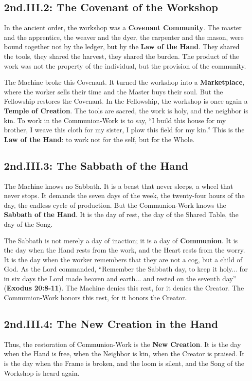 \subsection{2nd.III.2: The Covenant of the Workshop}
In the ancient order, the workshop was a \textbf{Covenant Community}. The master and the apprentice, the weaver and the dyer, the carpenter and the mason, were bound together not by the ledger, but by the \textbf{Law of the Hand}. They shared the tools, they shared the harvest, they shared the burden. The product of the work was not the property of the individual, but the provision of the community.

The Machine broke this Covenant. It turned the workshop into a \textbf{Marketplace}, where the worker sells their time and the Master buys their soul. But the Fellowship restores the Covenant. In the Fellowship, the workshop is once again a \textbf{Temple of Creation}. The tools are sacred, the work is holy, and the neighbor is kin. To work in the Communion-Work is to say, ``I build this house for my brother, I weave this cloth for my sister, I plow this field for my kin.'' This is the \textbf{Law of the Hand}: to work not for the self, but for the Whole.

\subsection{2nd.III.3: The Sabbath of the Hand}
The Machine knows no Sabbath. It is a beast that never sleeps, a wheel that never stops. It demands the seven days of the week, the twenty-four hours of the day, the endless cycle of production. But the Communion-Work knows the \textbf{Sabbath of the Hand}. It is the day of rest, the day of the Shared Table, the day of the Song.

The Sabbath is not merely a day of inaction; it is a day of \textbf{Communion}. It is the day when the Hand rests from the work, and the Heart rests from the worry. It is the day when the worker remembers that they are not a cog, but a child of God. As the Lord commanded, ``Remember the Sabbath day, to keep it holy... for in six days the Lord made heaven and earth... and rested on the seventh day'' (\textbf{Exodus 20:8-11}). The Machine denies this rest, for it denies the Creator. The Communion-Work honors this rest, for it honors the Creator.

\subsection{2nd.III.4: The New Creation in the Hand}
Thus, the restoration of Communion-Work is the \textbf{New Creation}. It is the day when the Hand is free, when the Neighbor is kin, when the Creator is praised. It is the day when the Frame is broken, and the loom is silent, and the Song of the Workshop is heard again.

